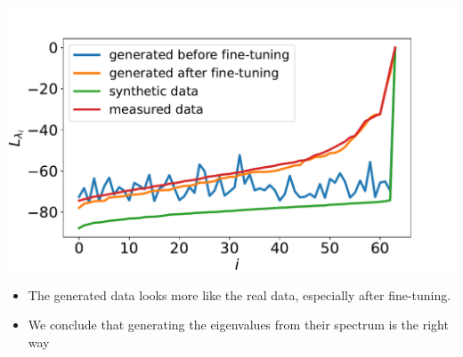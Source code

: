 \documentclass[12pt,pdftex,16x10]{elpres} %
\begin{document}
\begin{psli}
  \begin{minipage}[b][0.7\textheight][t]{0.5\textwidth}
    \centering
    \includegraphics[width=1.2\textwidth]{figs/samples_evals_dB_wgangp.pdf}
  \end{minipage}
  \begin{minipage}[b][0.7\textheight][t]{0.5\textwidth}
    \begin{itemize}
        \item The generated data looks more like the real data, especially after fine-tuning.
        \item We conclude that generating the eigenvalues from their spectrum is the right way
    \end{itemize}
  \end{minipage}
\end{psli}
\end{document}
